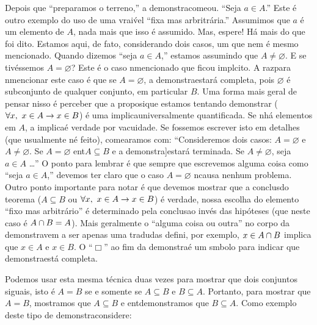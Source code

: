 Depois que ``preparamos o terreno,'' a demonstra\cao come\cc ou. ``Seja $a\in A$.'' Este \'e outro exemplo do uso de uma vrai\'vel ``fixa mas arbritr\'aria.'' Assumimos que $a$ \'e um elemento de $A$, nada mais que isso \'e assumido. Mas, espere! H\'a mais do que foi dito. Estamos aqui, de fato, considerando dois casos, um que nem \'e mesmo mencionado. Quando dizemos ``seja $a\in A$,'' estamos assumindo que $A\neq\varnothing$. E se tiv\'essemos $A=\varnothing$? Este \'e o caso n\ao mencionado que ficou impl\ih cito. A raz\ao para n\ao mencionar este caso \'e que se $A=\varnothing$, a demonstra\cao estar\'a completa, pois $\varnothing$ \'e subconjunto de qualquer conjunto, em particular $B$. Uma forma mais geral de pensar nisso \'e perceber que a proposi\cao que estamos tentando demonstrar ($\forall x, \textrm{ } x\in A\to x\in B $) \'e uma implica\cao universalmente quantificada. Se n\ao h\'a elementos em $A$, a implica\cao \'e verdade por vacuidade. Se fossemos escrever isto em detalhes (que usualmente n\ao \'e feito), come\cc ar\ih amos com: ``Consideremos dois casos: $A=\varnothing$ e $A\neq\varnothing$. Se $A=\varnothing$ ent\ao $A\subseteq B$ e a demonstra]\cao estar\'a terminada. Se $A\neq\varnothing$, seja $a\in A$ \ldots'' O ponto para lembrar \'e que sempre que escrevemos alguma coisa como ``seja $a\in A$,'' devemos ter claro que o caso $A=\varnothing$ n\ao causa nenhum problema. Outro ponto importante para notar \'e que devemos mostrar que a conclus\ao do teorema ($A\subseteq B$ ou $\forall x, \textrm{ } x\in A\to x\in B$) \'e verdade, nossa escolha do elemento ``fixo mas arbitr\'ario'' \'e determinado pela conclus\ao ao inv\'es das hip\'oteses (que neste caso \'e $A\cap B=A$). Mais geralmente o ``alguma coisa ou outra'' no corpo da demonstra\cao vem a ser apenas uma tradu\cao das defini\cois, por exemplo,  $x\in A\cap B$ implica que $x\in A$ e $x\in B$. O ``$\Box$'' ao fim da demonstra\cao \'e um s\ih mbolo para indicar que demonstra\cao est\'a completa.

Podemos usar esta mesma t\'ecnica duas vezes para mostrar que dois conjuntos s\ao iguais, isto \'e $A=B$ se e somente se $A\subseteq B$ e $B\subseteq A$. Portanto, para mostrar que $A=B$, mostramos que $A\subseteq B$ e ent\ao demonstramos que $B\subseteq A$. Como exemplo deste tipo de demonstra\cao considere:

